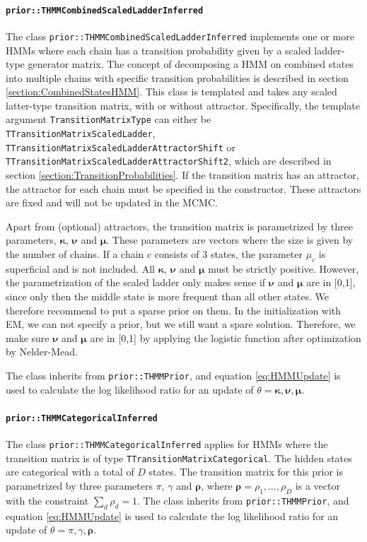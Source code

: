 \documentclass[a4paper,11pt]{article}
\def\bkappa{\boldsymbol{\kappa}}
\def\bmu{\boldsymbol{\mu}}
\def\bnu{\boldsymbol{\nu}}
\def\brho{\boldsymbol{\rho}}
\newcommand{\class}[1]{\texttt{#1}}
\newcommand{\type}[1]{\texttt{#1}}
\newcommand{\template}[1]{\texttt{#1}}
\begin{document}
\paragraph{\class{prior::THMMCombinedScaledLadderInferred}}
The class \class{prior::THMMCombinedScaledLadderInferred} implements one or more HMMs where each chain has a transition probability given by a scaled ladder-type generator matrix. The concept of decomposing a HMM on combined states into multiple chains with specific transition probabilities is described in section \ref{section:CombinedStatesHMM}. This class is templated and takes any scaled latter-type transition matrix, with or without attractor. Specifically, the template argument \template{TransitionMatrixType} can either be \type{TTransitionMatrixScaledLadder}, \type{TTransitionMatrixScaledLadderAttractorShift} or \type{TTransitionMatrixScaledLadderAttractorShift2}, which are described in section \ref{section:TransitionProbabilities}. If the transition matrix has an attractor, the attractor for each chain must be specified in the constructor. These attractors are fixed and will not be updated in the MCMC.

Apart from (optional) attractors, the transition matrix is parametrized by three parameters, $\bkappa$, $\bnu$ and $\bmu$. These parameters are vectors where the size is given by the number of chains. If a chain $c$ consists of 3 states, the parameter $\mu_c$ is superficial and is not included.
All $\bkappa$, $\bnu$ and $\bmu$ must be strictly positive. However, the parametrization of the scaled ladder only makes sense if $\bnu$ and $\bmu$ are in [0,1], since only then the middle state is more frequent than all other states. We therefore recommend to put a sparse prior on them. In the initialization with EM, we can not specify a prior, but we still want a spare solution. Therefore, we make sure $\bnu$ and $\bmu$ are in [0,1] by applying the logistic function after optimization by Nelder-Mead.

The class inherits from \class{prior::THMMPrior}, and equation \ref{eq:HMMUpdate} is used to calculate the log likelihood ratio for an update of $\theta = \bkappa, \bnu, \bmu$.

\paragraph{\class{prior::THMMCategoricalInferred}}
The class \class{prior::THMMCategoricalInferred} applies for HMMs where the transition matrix is of type \class{TTransitionMatrixCategorical}. The hidden states are categorical with a total of $D$ states. The transition matrix for this prior is parametrized by three parameters $\pi$, $\gamma$ and $\brho$, where $\brho = \rho_1, \ldots, \rho_D$ is a vector with the constraint $\sum_d \rho_d = 1$. The class inherits from \class{prior::THMMPrior}, and equation \ref{eq:HMMUpdate} is used to calculate the log likelihood ratio for an update of $\theta = \pi, \gamma, \brho$.
\end{document}

